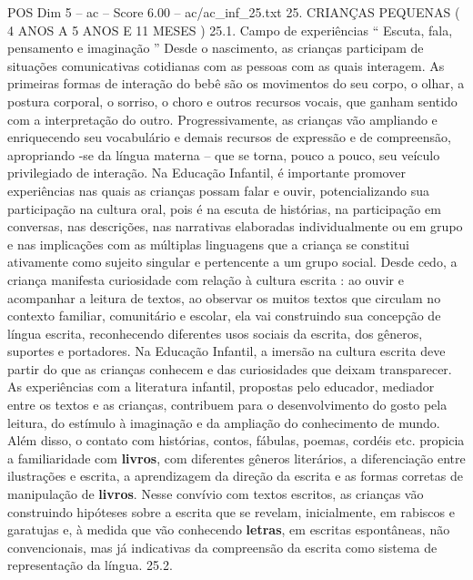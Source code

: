 \begin{textsample}{POS Dim 5 – ac – Score 6.00 – ac/ac\_inf\_25.txt}  \label{ex:f5_pos_126}
25.
CRIANÇAS PEQUENAS ( 4 ANOS A 5 ANOS E 11 MESES ) 25.1.
Campo de experiências “ Escuta, fala, pensamento e imaginação ” Desde o nascimento, as crianças participam de situações comunicativas cotidianas com as pessoas com as quais interagem.
As primeiras formas de interação do bebê são os movimentos do seu corpo, o olhar, a postura corporal, o sorriso, o choro e outros recursos vocais, que ganham sentido com a interpretação do outro.
Progressivamente, as crianças vão ampliando e enriquecendo seu vocabulário e demais recursos de expressão e de compreensão, apropriando -se da língua materna – que se torna, pouco a pouco, seu veículo privilegiado de interação.
Na Educação Infantil, é importante promover experiências nas quais as crianças possam falar e ouvir, potencializando sua participação na cultura oral, pois é na escuta de histórias, na participação em conversas, nas descrições, nas narrativas elaboradas individualmente ou em grupo e nas implicações com as múltiplas linguagens que a criança se constitui ativamente como sujeito singular e pertencente a um grupo social.
Desde cedo, a criança manifesta curiosidade com relação à cultura escrita : ao ouvir e acompanhar a leitura de textos, ao observar os muitos textos que circulam no contexto familiar, comunitário e escolar, ela vai construindo sua concepção de língua escrita, reconhecendo diferentes usos sociais da escrita, dos gêneros, suportes e portadores.
Na Educação Infantil, a imersão na cultura escrita deve partir do que as crianças conhecem e das curiosidades que deixam transparecer.
As experiências com a literatura infantil, propostas pelo educador, mediador entre os textos e as crianças, contribuem para o desenvolvimento do gosto pela leitura, do estímulo à imaginação e da ampliação do conhecimento de mundo.
Além disso, o contato com histórias, contos, fábulas, poemas, cordéis etc. propicia a familiaridade com \textbf{livros}, com diferentes gêneros literários, a diferenciação entre ilustrações e escrita, a aprendizagem da direção da escrita e as formas corretas de manipulação de \textbf{livros}.
Nesse convívio com textos escritos, as crianças vão construindo hipóteses sobre a escrita que se revelam, inicialmente, em rabiscos e garatujas e, à medida que vão conhecendo \textbf{letras}, em escritas espontâneas, não convencionais, mas já indicativas da compreensão da escrita como sistema de representação da língua. 25.2.

\end{textsample}
